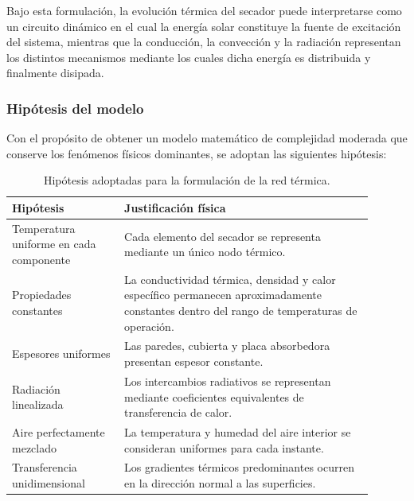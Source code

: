 Bajo esta formulación, la evolución térmica del secador puede interpretarse como un circuito dinámico en el cual la energía solar constituye la fuente de excitación del sistema, mientras que la conducción, la convección y la radiación representan los distintos mecanismos mediante los cuales dicha energía es distribuida y finalmente disipada.

\subsubsection{Hipótesis del modelo}

Con el propósito de obtener un modelo matemático de complejidad moderada que conserve los fenómenos físicos dominantes, se adoptan las siguientes hipótesis:

\begin{table}[h!]
\centering
\caption{Hipótesis adoptadas para la formulación de la red térmica.}
\begin{tabular}{p{0.28\linewidth}p{0.62\linewidth}}
\toprule
Hipótesis & Justificación física\\
\midrule

Temperatura uniforme en cada componente
&
Cada elemento del secador se representa mediante un único nodo térmico.

\\[0.3cm]

Propiedades constantes
&
La conductividad térmica, densidad y calor específico permanecen aproximadamente constantes dentro del rango de temperaturas de operación.

\\[0.3cm]

Espesores uniformes
&
Las paredes, cubierta y placa absorbedora presentan espesor constante.

\\[0.3cm]

Radiación linealizada
&
Los intercambios radiativos se representan mediante coeficientes equivalentes de transferencia de calor.

\\[0.3cm]

Aire perfectamente mezclado
&
La temperatura y humedad del aire interior se consideran uniformes para cada instante.

\\[0.3cm]

Transferencia unidimensional
&
Los gradientes térmicos predominantes ocurren en la dirección normal a las superficies.

\\

\bottomrule
\end{tabular}
\end{table}

